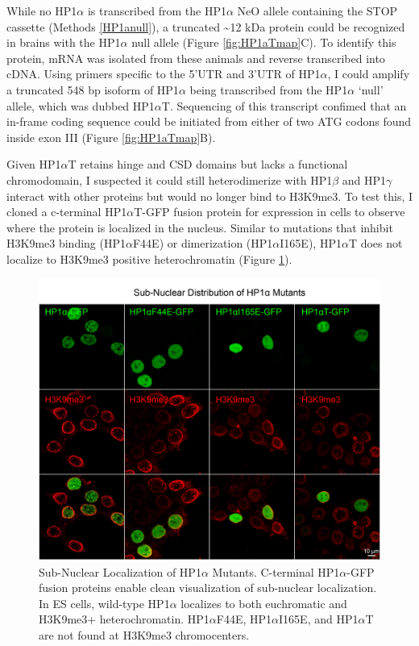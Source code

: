 \documentclass[onehalf,12pt]{beavtex}
\begin{document}
  \FloatBarrier
  
  While no HP1\(\alpha\) is transcribed from the HP1\(\alpha\) NeO allele
  containing the STOP cassette (Methods \ref{HP1anull}), a truncated
  \textasciitilde{}12 kDa protein could be recognized in brains with the
  HP1\(\alpha\) null allele (Figure \ref{fig:HP1aTmap}C). To identify this
  protein, mRNA was isolated from these animals and reverse transcribed
  into cDNA. Using primers specific to the 5'UTR and 3'UTR of
  HP1\(\alpha\), I could amplify a truncated 548 bp isoform of
  HP1\(\alpha\) being transcribed from the HP1\(\alpha\) `null' allele,
  which was dubbed HP1\(\alpha\)T. Sequencing of this transcript confimed
  that an in-frame coding sequence could be initiated from either of two
  ATG codons found inside exon III (Figure \ref{fig:HP1aTmap}B).
  
  Given HP1\(\alpha\)T retains hinge and CSD domains but lacks a
  functional chromodomain, I suspected it could still heterodimerize with
  HP1\(\beta\) and HP1\(\gamma\) interact with other proteins but would no
  longer bind to H3K9me3. To test this, I cloned a c-terminal
  HP1\(\alpha\)T-GFP fusion protein for expression in cells to observe
  where the protein is localized in the nucleus. Similar to mutations that
  inhibit H3K9me3 binding (HP1\(\alpha\)F44E) or dimerization
  (HP1\(\alpha\)I165E), HP1\(\alpha\)T does not localize to H3K9me3
  positive heterochromatin (Figure \ref{fig:HP1amut}).
  
  \begin{figure}
  
  {\centering \includegraphics[width=1\linewidth, ]{./figure/results/HP1amut} 
  
  }
  
  \caption[Sub-Nuclear Localization of HP1$\alpha$ Mutants]{Sub-Nuclear Localization of HP1$\alpha$ Mutants.  C-terminal HP1$\alpha$-GFP fusion proteins enable clean visualization of sub-nuclear localization.  In ES cells, wild-type HP1$\alpha$ localizes to both euchromatic and H3K9me3+ heterochromatin. HP1$\alpha$F44E, HP1$\alpha$I165E, and HP1$\alpha$T are not found at H3K9me3 chromocenters.}\label{fig:HP1amut}
  \end{figure}
  
\end{document}
